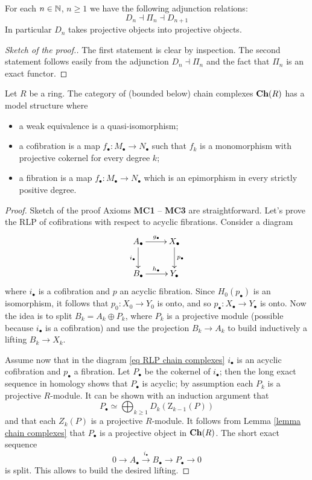 \begin{refsection}
\begin{lemma} \label{lemma chain complexes}
For each $n \in \mathbb{N}$, $n \ge 1$ we have the following adjunction relations:
\[
D_n \dashv \Pi_n \dashv D_{n+1}
\]
In particular $D_n$ takes projective objects into projective objects.
\end{lemma}

\begin{proof}[Sketch of the proof.]
The first statement is clear by inspection. The second statement follows easily from the adjunction $D_n \dashv \Pi_n$ and the fact that $\Pi_n$ is an exact functor.
\end{proof}

\begin{thm}
Let $R$ be a ring. The category of (bounded below) chain complexes $\mathbf{Ch}(R)$ has a model structure where
\begin{itemize}
\item a weak equivalence is a quasi-isomorphism;
\item a cofibration is a map $f_\bullet \colon M_\bullet \to N_\bullet$ such that $f_k$ is a monomorphism with projective cokernel for every degree $k$;
\item a fibration is a map $f_\bullet \colon M_\bullet \to N_\bullet$ which is an epimorphism in every strictly positive degree.
\end{itemize}
\end{thm}

\begin{proof}{Sketch of the proof}
Axioms {\bfseries MC1} -- {\bfseries MC3} are straightforward. Let's prove the RLP of cofibrations with respect to acyclic fibrations. Consider a diagram
\begin{equation} \label{eq RLP chain complexes}
\xymatrix{
A_\bullet \ar[r]^{g_\bullet} \ar[d]_{i_\bullet} & X_\bullet \ar[d]^{p_\bullet} \\ B_\bullet \ar[r]^{h_\bullet} & Y_\bullet
}
\end{equation}
where $i_\bullet$ is a cofibration and $p$ an acyclic fibration. Since $H_0(p_\bullet)$ is an isomorphism, it follows that $p_0 \colon X_0 \to Y_0$ is onto, and so $p_\bullet \colon X_\bullet \to Y_\bullet$ is onto. Now the idea is to split $B_k = A_k \oplus P_k$, where $P_k$ is a projective module (possible because $i_\bullet$ is a cofibration) and use the projection $B_k \to A_k$ to build inductively a lifting $B_k \to X_k$.

Assume now that in the diagram \eqref{eq RLP chain complexes} $i_\bullet$ is an acyclic cofibration and $p_\bullet$ a fibration. Let $P_\bullet$ be the cokernel of $i_\bullet$; then the long exact sequence in homology shows that $P_\bullet$ is acyclic; by assumption each $P_k$ is a projective $R$-module. It can be shown with an induction argument that
\[
P_\bullet \simeq \bigoplus_{k \ge 1} D_k(\mathrm{Z}_{k-1}(P))
\]
and that each $Z_k(P)$ is a projective $R$-module. It follows from Lemma \ref{lemma chain complexes} that $P_\bullet$ is a projective object in $\mathbf{Ch}(R)$. The short exact sequence
\[
0 \to A_\bullet \xrightarrow{i_\bullet} B_\bullet \to P_\bullet \to 0
\]
is split. This allows to build the desired lifting.


\end{proof}
\end{refsection}
